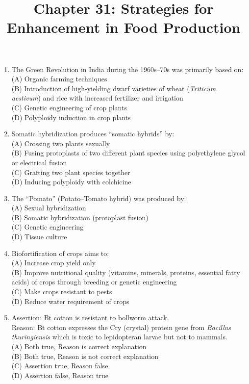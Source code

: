 \documentclass{article}
\begin{document}
\title{Chapter 31: Strategies for Enhancement in Food Production}
\date{}
\maketitle

\begin{enumerate}[label=Q\arabic*.]

\item The Green Revolution in India during the 1960s--70s was primarily based on:
\\(A) Organic farming techniques
\\(B) Introduction of high-yielding dwarf varieties of wheat (\textit{Triticum aestivum}) and rice with increased fertilizer and irrigation
\\(C) Genetic engineering of crop plants
\\(D) Polyploidy induction in crop plants

\item Somatic hybridization produces ``somatic hybrids'' by:
\\(A) Crossing two plants sexually
\\(B) Fusing protoplasts of two different plant species using polyethylene glycol or electrical fusion
\\(C) Grafting two plant species together
\\(D) Inducing polyploidy with colchicine

\item The ``Pomato'' (Potato--Tomato hybrid) was produced by:
\\(A) Sexual hybridization
\\(B) Somatic hybridization (protoplast fusion)
\\(C) Genetic engineering
\\(D) Tissue culture

\item Biofortification of crops aims to:
\\(A) Increase crop yield only
\\(B) Improve nutritional quality (vitamins, minerals, proteins, essential fatty acids) of crops through breeding or genetic engineering
\\(C) Make crops resistant to pests
\\(D) Reduce water requirement of crops

\item Assertion: Bt cotton is resistant to bollworm attack.\\
Reason: Bt cotton expresses the Cry (crystal) protein gene from \textit{Bacillus thuringiensis} which is toxic to lepidopteran larvae but not to mammals.
\\(A) Both true, Reason is correct explanation
\\(B) Both true, Reason is not correct explanation
\\(C) Assertion true, Reason false
\\(D) Assertion false, Reason true


\end{enumerate}
\end{document}
